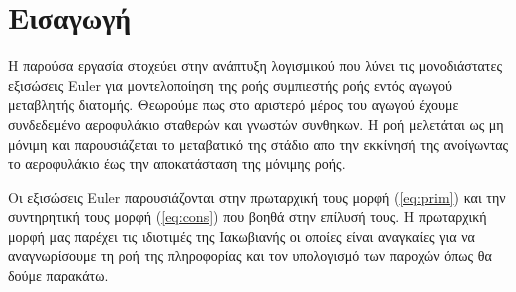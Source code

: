 \section*{Εισαγωγή}

Η παρούσα εργασία στοχεύει στην ανάπτυξη λογισμικού που λύνει τις μονοδιάστατες εξισώσεις Euler για μοντελοποίηση της ροής συμπιεστής ροής εντός αγωγού μεταβλητής διατομής. Θεωρούμε πως στο αριστερό μέρος του αγωγού έχουμε συνδεδεμένο αεροφυλάκιο σταθερών και γνωστών συνθηκων. Η ροή μελετάται ως μη μόνιμη και παρουσιάζεται το μεταβατικό της στάδιο απο την εκκίνησή της ανοίγωντας το αεροφυλάκιο έως την αποκατάσταση της μόνιμης ροής. 

Οι εξισώσεις Euler παρουσιάζονται στην πρωταρχική τους μορφή (\ref{eq:prim}) και την συντηρητική τους μορφή (\ref{eq:cons}) που βοηθά στην επίλυσή τους. Η πρωταρχική μορφή μας παρέχει τις ιδιοτιμές της Ιακωβιανής οι οποίες είναι αναγκαίες για να αναγνωρίσουμε τη ροή της πληροφορίας και τον υπολογισμό των παροχών όπως θα δούμε παρακάτω.

